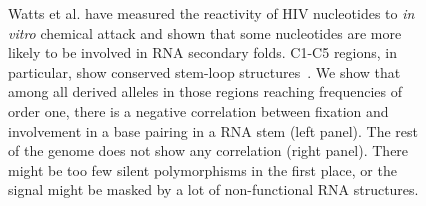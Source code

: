 \documentclass[12pt,a4paper,notitlepage,onecolumn]{article}
\begin{document}
\begin{figure}
\begin{center}
\caption{Watts et al. have measured the reactivity of HIV nucleotides to {\it in
vitro} chemical attack and shown that some nucleotides are more likely to be
involved in RNA secondary folds. C1-C5 regions, in particular, show conserved
stem-loop structures~\citep{watts_architecture_2009}. We show that among all
derived alleles in those regions reaching frequencies of order one, there is a negative
correlation between fixation and involvement in a base pairing in a RNA stem
(left panel). The rest of the genome does not show any correlation (right
panel). There might be too few silent polymorphisms in the first place, or the
signal might be masked by a lot of non-functional RNA structures.}
\end{center}
\end{figure}
\end{document}

